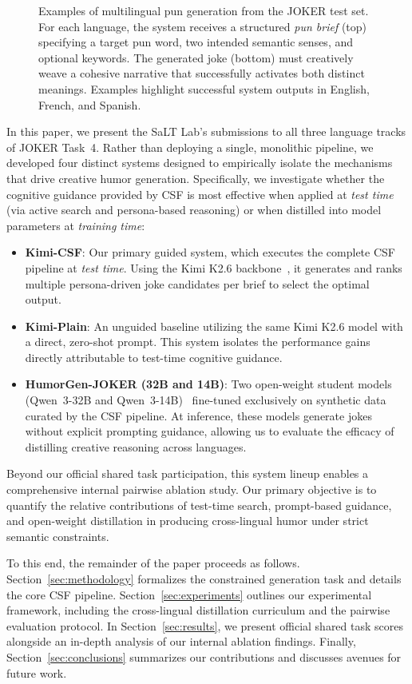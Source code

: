 \documentclass[]{ceurart}
\begin{document}
\begin{figure}[ht]
\caption{Examples of multilingual pun generation from the JOKER test set. For each language, the system receives a structured \emph{pun brief} (top) specifying a target pun word, two intended semantic senses, and optional keywords. The generated joke (bottom) must creatively weave a cohesive narrative that successfully activates both distinct meanings. Examples highlight successful system outputs in English, French, and Spanish.}
\label{fig:pun-examples}
\end{figure}

In this paper, we present the SaLT Lab's submissions to all three language tracks of JOKER Task~4. Rather than deploying a single, monolithic pipeline, we developed four distinct systems designed to empirically isolate the mechanisms that drive creative humor generation. Specifically, we investigate whether the cognitive guidance provided by CSF is most effective when applied at \emph{test time} (via active search and persona-based reasoning) or when distilled into model parameters at \emph{training time}:
\begin{itemize}
  \item \textbf{Kimi-CSF}: Our primary guided system, which executes the complete CSF pipeline at \emph{test time}. Using the Kimi K2.6 backbone~\cite{team2025kimi}, it generates and ranks multiple persona-driven joke candidates per brief to select the optimal output.
  \item \textbf{Kimi-Plain}: An unguided baseline utilizing the same Kimi K2.6 model with a direct, zero-shot prompt. This system isolates the performance gains directly attributable to test-time cognitive guidance.
  \item \textbf{HumorGen-JOKER (32B and 14B)}: Two open-weight student models (Qwen~3-32B and Qwen~3-14B)~\cite{yang2025qwen3} fine-tuned exclusively on synthetic data curated by the CSF pipeline. At inference, these models generate jokes without explicit prompting guidance, allowing us to evaluate the efficacy of distilling creative reasoning across languages.
\end{itemize}

Beyond our official shared task participation, this system lineup enables a comprehensive internal pairwise ablation study. Our primary objective is to quantify the relative contributions of test-time search, prompt-based guidance, and open-weight distillation in producing cross-lingual humor under strict semantic constraints.

To this end, the remainder of the paper proceeds as follows. Section~\ref{sec:methodology} formalizes the constrained generation task and details the core CSF pipeline. Section~\ref{sec:experiments} outlines our experimental framework, including the cross-lingual distillation curriculum and the pairwise evaluation protocol. In Section~\ref{sec:results}, we present official shared task scores alongside an in-depth analysis of our internal ablation findings. Finally, Section~\ref{sec:conclusions} summarizes our contributions and discusses avenues for future work.
\end{document}
